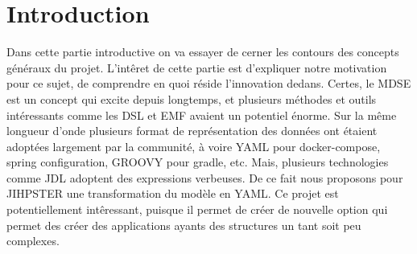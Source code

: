 \section{Introduction}

Dans cette partie introductive on va essayer de cerner les contours des
concepts généraux du projet. L'intêret de cette partie est d'expliquer
notre motivation pour ce sujet, de comprendre en quoi réside
l'innovation dedans. Certes, le MDSE est un concept qui excite depuis
longtemps, et plusieurs méthodes et outils intéressants comme les DSL et
EMF avaient un potentiel énorme. Sur la même longueur d'onde plusieurs
format de représentation des données ont étaient adoptées largement par
la communité, à voire YAML pour docker-compose, spring configuration,
GROOVY pour gradle, etc. Mais, plusieurs technologies comme JDL adoptent
des expressions verbeuses. De ce fait nous proposons pour JIHPSTER une
transformation du modèle en YAML. Ce projet est potentiellement
intêressant, puisque il permet de créer de nouvelle option qui permet
des créer des applications ayants des structures un tant soit peu
complexes.


